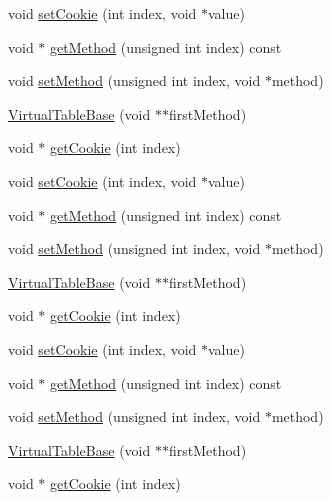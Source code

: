 \begin{DoxyCompactItemize}
void \mbox{\hyperlink{structfakeit_1_1VirtualTableBase_a88c0ad603268ec3f250c20aea730e23c}{set\+Cookie}} (int index, void $\ast$value)
\item 
void $\ast$ \mbox{\hyperlink{structfakeit_1_1VirtualTableBase_a54b22562832757fe151a9b8d0e46c26d}{get\+Method}} (unsigned int index) const
\item 
void \mbox{\hyperlink{structfakeit_1_1VirtualTableBase_aa1996cddf28f78a50b87cbeff072ff06}{set\+Method}} (unsigned int index, void $\ast$method)
\item 
\mbox{\hyperlink{structfakeit_1_1VirtualTableBase_a29219a58bbe09da749b35289469ef886}{Virtual\+Table\+Base}} (void $\ast$$\ast$first\+Method)
\item 
void $\ast$ \mbox{\hyperlink{structfakeit_1_1VirtualTableBase_a10a40c78e7e76a1d7186e2793abd0821}{get\+Cookie}} (int index)
\item 
void \mbox{\hyperlink{structfakeit_1_1VirtualTableBase_a88c0ad603268ec3f250c20aea730e23c}{set\+Cookie}} (int index, void $\ast$value)
\item 
void $\ast$ \mbox{\hyperlink{structfakeit_1_1VirtualTableBase_a54b22562832757fe151a9b8d0e46c26d}{get\+Method}} (unsigned int index) const
\item 
void \mbox{\hyperlink{structfakeit_1_1VirtualTableBase_aa1996cddf28f78a50b87cbeff072ff06}{set\+Method}} (unsigned int index, void $\ast$method)
\item 
\mbox{\hyperlink{structfakeit_1_1VirtualTableBase_a29219a58bbe09da749b35289469ef886}{Virtual\+Table\+Base}} (void $\ast$$\ast$first\+Method)
\item 
void $\ast$ \mbox{\hyperlink{structfakeit_1_1VirtualTableBase_a10a40c78e7e76a1d7186e2793abd0821}{get\+Cookie}} (int index)
\item 
void \mbox{\hyperlink{structfakeit_1_1VirtualTableBase_a88c0ad603268ec3f250c20aea730e23c}{set\+Cookie}} (int index, void $\ast$value)
\item 
void $\ast$ \mbox{\hyperlink{structfakeit_1_1VirtualTableBase_a54b22562832757fe151a9b8d0e46c26d}{get\+Method}} (unsigned int index) const
\item 
void \mbox{\hyperlink{structfakeit_1_1VirtualTableBase_aa1996cddf28f78a50b87cbeff072ff06}{set\+Method}} (unsigned int index, void $\ast$method)
\item 
\mbox{\hyperlink{structfakeit_1_1VirtualTableBase_a29219a58bbe09da749b35289469ef886}{Virtual\+Table\+Base}} (void $\ast$$\ast$first\+Method)
\item 
void $\ast$ \mbox{\hyperlink{structfakeit_1_1VirtualTableBase_a10a40c78e7e76a1d7186e2793abd0821}{get\+Cookie}} (int index)
$$
\end{DoxyCompactItemize}

